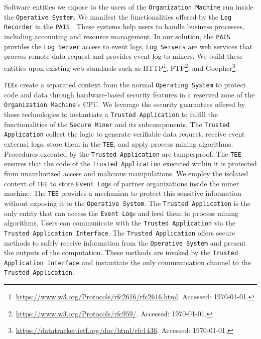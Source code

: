 Software entities we expose to the users of the \texttt{Organization Machine} run inside the \texttt{Operative System}. We manifest the functionalities offered by the \texttt{Log Recorder} in the \texttt{PAIS}  \cite{Dumas.etal/2018:FundamentalsofBPM}. These systems help users to handle business processes, including accounting and resource management. In our solution, the \texttt{PAIS} provides the \texttt{Log Server} access to event logs. \texttt{Log Servers} are web services that process remote data request and provides event log to miners. We build these entities upon existing web standards such as HTTP\footnote{\url{https://www.w3.org/Protocols/rfc2616/rfc2616.html}. Accessed: \today.}, FTP\footnote{\url{https://www.w3.org/Protocols/rfc959/}. Accessed: \today.}, and Goopher\footnote{\url{https://datatracker.ietf.org/doc/html/rfc1436}. Accessed: \today.}.

\texttt{TEE}s create a separated context from the normal \texttt{Operating System} to protect code and data through hardware-based security features in a reserved zone of the \texttt{Organization Machine}'s CPU. We leverage the security guarantees offered by these technologies to instantiate a \texttt{Trusted Application} to fulfill the functionalities of the \texttt{Secure Miner} and its subcomponents. The \texttt{Trusted Application} collect the logic to generate verifiable data request, receive event external logs, store them in the \texttt{TEE}, and apply process mining algorithms. Procedures executed by the \texttt{Trusted Application} are tamperproof. The \texttt{TEE} ensures that the code of the \texttt{Trusted Application} executed within it is protected from unauthorized access and malicious manipulations. We employ the isolated context of \texttt{TEE} to store \texttt{Event Log}s of partner organizations inside the miner machine. The \texttt{TEE} provides a mechanism to protect this sensitive information without exposing it to the \texttt{Operative System}. The \texttt{Trusted Application} is the only entity that can access the \texttt{Event Log}s and feed them to process mining algorithms. Users can communicate with the \texttt{Trusted Application} via the \texttt{Trusted Application Interface}. The \texttt{Trusted Application} offers secure methods to safely receive information from the \texttt{Operative System} and present the outputs of the computation. These methods are invoked by the \texttt{Trusted Application Interface} and instantiate the only communication channel to the \texttt{Trusted Application}.

